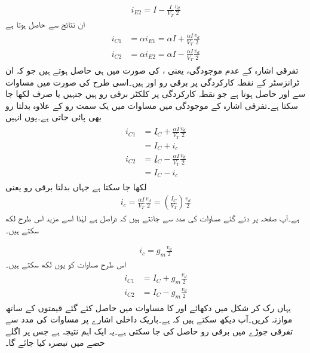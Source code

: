 \begin{align}\label{مساوات_تفرقی_جوڑا_دوسری_برقی_رو}
i_{E2}=I-\frac{I}{V_T}\frac{v_d}{2}
\end{align}
ان نتائج سے حاصل ہوتا ہے
\begin{gather}
\begin{aligned} \label{مساوات_تفرقی_پہلی_رو_تسلسل_کے_دو_جز}
i_{C1}&=\alpha i_{E1}=\alpha I +\frac{\alpha I}{V_T} \frac{v_d}{2}\\
i_{C2}&=\alpha i_{E2}=\alpha I -\frac{\alpha I}{V_T} \frac{v_d}{2}
\end{aligned}
\end{gather}
تفرقی اشارہ کے عدم موجودگی، یعنی  ، کی صورت میں   ہی حاصل ہوتے ہیں جو کہ ان ٹرانزسٹر کے نقطہ کارکردگی پر برقی رو  اور   ہیں۔اسی طرح  کی صورت میں مساوات   سے  اور  حاصل ہوتا ہے جو نقطہ کارکردگی پر کلکٹر برقی رو ہیں جنہیں  یا صرف  لکھا جا سکتا ہے۔تفرقی اشارہ کے موجودگی میں مساوات  میں یک سمت رو کے علاوہ بدلتا رو بھی پائی جاتی ہے۔یوں انہیں
\begin{gather}
\begin{aligned}
i_{C1}&=ِI_{C}+\frac{\alpha I}{V_T} \frac{v_d}{2}\\
&=I_{C}+i_c\\
i_{C2}&=ِI_{C}-\frac{\alpha I}{V_T} \frac{v_d}{2}\\
&=I_{C}-i_c
\end{aligned}
\end{gather}
لکھا جا سکتا ہے جہاں   بدلتا برقی رو یعنی
\begin{align}
i_c=\frac{\alpha I}{V_T}\frac{v_d}{2}=\left(\frac{I_{C}}{V_T}\right) \frac{v_d}{2}
\end{align}
ہے۔آپ صفحہ  پر دئے گئے مساوات  کی مدد سے جانتے ہیں کہ  دراصل  ہے لہٰذا اسے مزید اس طرح لکھ سکتے ہیں۔

\begin{align} \label{مساوات_تفرقی_اشاراتی_رو}
i_c=g_m \frac{v_d}{2}
\end{align}
اس طرح مساوات  کو یوں لکھ سکتے ہیں۔
\begin{gather}
\begin{aligned}
i_{C1}&=I_{C}+g_m \frac{v_d}{2}\\
i_{C2}&=I_{C} - g_m \frac{v_d}{2}
\end{aligned}
\end{gather}
یہاں رک کر شکل   میں دکھائے  اور  کا مساوات  میں حاصل کئے گئے قیمتوں کے ساتھ موازنہ کریں۔آپ دیکھ سکتے ہیں کہ  ہے۔باریک داخلی اشارے پر  مساوات   کی مدد سے  تفرقی جوڑے میں برقی رو   حاصل کی جا سکتی ہے۔یہ ایک اہم نتیجہ ہے جس پر اگلے حصے میں تبصرہ کیا جائے گا۔


